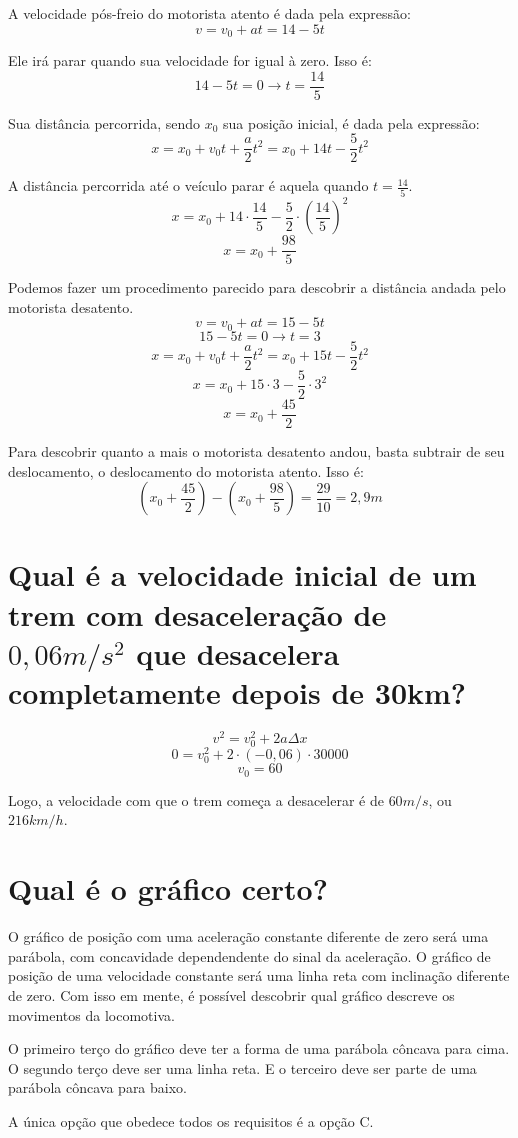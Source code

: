 \documentclass{article}
\begin{document}
    \hspace{\parindent}A velocidade pós-freio do motorista atento é dada pela expressão:
    \[v=v_0+at=14-5t\]
    \par Ele irá parar quando sua velocidade for igual à zero. Isso é:
    \[14-5t=0 \rightarrow t=\frac{14}{5}\]
    \par Sua distância percorrida, sendo \(x_0\) sua posição inicial, é dada pela expressão:
    \[x=x_0+v_0t+\frac{a}{2}t^2=x_0+14t-\frac{5}{2}t^2\]
    \par A distância percorrida até o veículo parar é aquela quando \(t=\frac{14}{5}\).
    \[x=x_0+14\cdot\frac{14}{5}-\frac{5}{2}\cdot(\frac{14}{5})^2\]
    \[x=x_0+\frac{98}{5}\]
    \par Podemos fazer um procedimento parecido para descobrir a distância andada pelo motorista desatento.
    \[v=v_0+at=15-5t\]
    \[15-5t=0 \rightarrow t=3\]
    \[x=x_0+v_0t+\frac{a}{2}t^2=x_0+15t-\frac{5}{2}t^2\]
    \[x=x_0+15\cdot3-\frac{5}{2}\cdot3^2\]
    \[x=x_0+\frac{45}{2}\]
    \par Para descobrir quanto a mais o motorista desatento andou, basta subtrair de seu deslocamento, o deslocamento do motorista atento. Isso é:
    \[(x_0+\frac{45}{2})-(x_0+\frac{98}{5})=\frac{29}{10}=2,9m\]

\section{Qual é a velocidade inicial de um trem com desaceleração de \(0,06m/s^2\) que desacelera completamente depois de 30km?}
    \[v^2=v_0^2+2a\Delta x\]
    \[0=v_0^2+2\cdot (-0,06)\cdot 30000\]
    \[v_0=60\]
    \par Logo, a velocidade com que o trem começa a desacelerar é de \(60m/s\), ou \(216km/h\).

\section{Qual é o gráfico certo?}
    \hspace{\parindent}O gráfico de posição com uma aceleração constante diferente de zero será uma parábola, com concavidade dependendente do sinal da aceleração. O gráfico de posição de uma velocidade constante será uma linha reta com inclinação diferente de zero. Com isso em mente, é possível descobrir qual gráfico descreve os movimentos da locomotiva.
    \par O primeiro terço do gráfico deve ter a forma de uma parábola côncava para cima. O segundo terço deve ser uma linha reta. E o terceiro deve ser parte de uma parábola côncava para baixo.
    \par A única opção que obedece todos os requisitos é a opção C.
\end{document}
